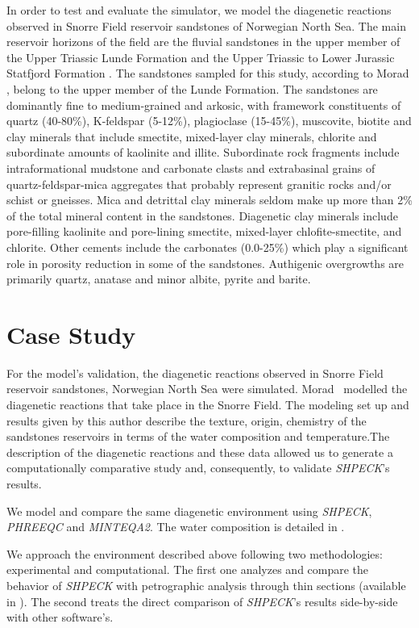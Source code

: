 
In order to test and evaluate the simulator, we model the diagenetic reactions observed in Snorre Field reservoir sandstones of Norwegian North Sea. The main reservoir horizons of the field are the fluvial sandstones in the upper member of the Upper Triassic Lunde Formation and the Upper Triassic to Lower Jurassic Statfjord Formation \cite{Hollander:87}. The sandstones sampled for this study, according to Morad \cite{Morad:90}, belong to the upper member of the Lunde Formation. The sandstones are dominantly fine to  medium-grained and arkosic, with framework constituents of quartz (40-80\%), K-feldspar (5-12\%), plagioclase (15-45\%), muscovite, biotite and clay minerals that include smectite, mixed-layer clay minerals, chlorite and subordinate amounts of kaolinite and illite. Subordinate rock fragments include intraformational mudstone and carbonate clasts and extrabasinal grains of quartz-feldspar-mica aggregates that probably represent granitic rocks and/or schist or gneisses. Mica and detrittal clay minerals seldom make up more than 2\% of the total mineral content in the sandstones. Diagenetic clay minerals include pore-filling kaolinite and pore-lining smectite, mixed-layer chlofite-smectite, and chlorite. Other cements include the carbonates (0.0-25\%) which play a significant role in porosity reduction in some of the sandstones. Authigenic overgrowths are primarily quartz, anatase and minor albite, pyrite and barite.

\section{Case Study}
For the model’s validation, the diagenetic reactions observed in Snorre Field reservoir sandstones, Norwegian North Sea were simulated. Morad~\cite{Morad:90} modelled the diagenetic reactions that take place in the Snorre Field. The modeling set up and results given by this author describe the texture, origin, chemistry of the sandstones reservoirs in terms of the water composition and temperature.The description of the diagenetic reactions and these data allowed us to generate a computationally comparative study and, consequently, to validate \emph{SHPECK}'s results. 


We model and compare the same diagenetic environment using \emph{SHPECK}, \emph{PHREEQC} and \emph{MINTEQA2}. The water composition is detailed in \cite{Nordstrom:79}.


We approach the environment described above following two methodologies: experimental and computational. The first one analyzes and compare the behavior of \emph{SHPECK} with petrographic analysis through thin sections (available in \cite{Morad:90}). The second treats the direct comparison of \emph{SHPECK}'s results side-by-side with other software's.

